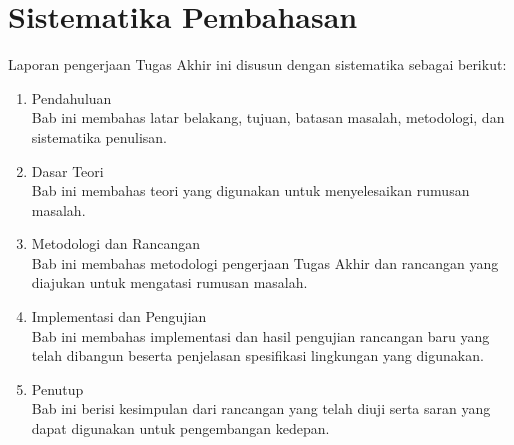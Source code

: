 \section{Sistematika Pembahasan}

Laporan pengerjaan Tugas Akhir ini disusun dengan sistematika sebagai berikut:

\begin{enumerate}[label=Bab \arabic*,itemindent=*]
	\item Pendahuluan\\
	Bab ini membahas latar belakang, tujuan, batasan masalah, metodologi, dan sistematika penulisan.
	\item Dasar Teori\\
	Bab ini membahas teori yang digunakan untuk menyelesaikan rumusan masalah.
	\item Metodologi dan Rancangan\\
	Bab ini membahas metodologi pengerjaan Tugas Akhir dan rancangan yang diajukan untuk mengatasi rumusan masalah.
	\item Implementasi dan Pengujian\\
	Bab ini membahas implementasi dan hasil pengujian rancangan baru yang telah dibangun beserta penjelasan spesifikasi lingkungan yang digunakan.
	\item Penutup\\
	Bab ini berisi kesimpulan dari rancangan yang telah diuji serta saran yang dapat digunakan untuk pengembangan kedepan.
\end{enumerate}
